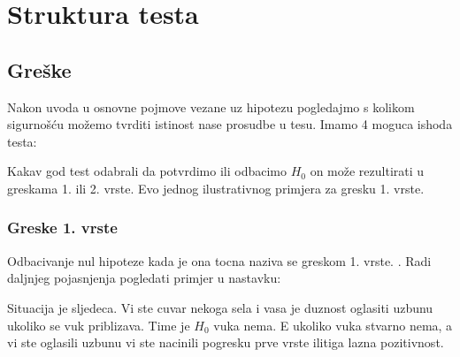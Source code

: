 \chapter{Struktura testa}

\section{Greške}

Nakon uvoda u osnovne pojmove vezane uz hipotezu pogledajmo s kolikom sigurnošću možemo tvrditi istinost nase prosudbe u tesu. Imamo 4 moguca ishoda testa:


\begin{table}[h]
\end{table}

Kakav god test odabrali da potvrdimo ili odbacimo $H_0$ on može rezultirati u greskama 1. ili 2. vrste. Evo jednog ilustrativnog primjera za gresku 1. vrste.

\subsection{Greske 1. vrste}

Odbacivanje nul hipoteze kada je ona tocna naziva se greskom 1. vrste. \cite{engstat}. Radi daljnjeg pojasnjenja pogledati primjer u nastavku:

Situacija je sljedeca. Vi ste cuvar nekoga sela i vasa je duznost oglasiti uzbunu ukoliko se vuk priblizava. Time je $H_0$ vuka nema. E ukoliko vuka stvarno nema, a vi ste oglasili uzbunu vi ste nacinili pogresku prve vrste ilitiga lazna pozitivnost.

